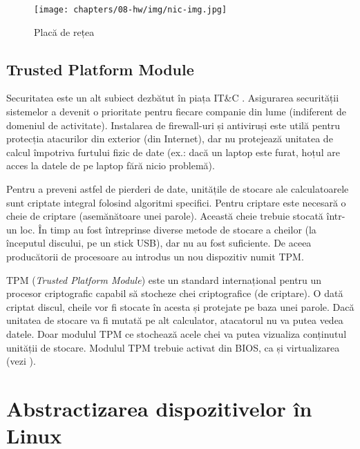 \begin{figure}[!htbp]
	\centering
	\texttt{[image: chapters/08-hw/img/nic-img.jpg]}
	\caption{Placă de rețea\protect\footnotemark}
	\label{fig:hw:nic}
\end{figure}


\subsection{Trusted Platform Module}
\label{sec:hw:features:tpm}

Securitatea este un alt subiect dezbătut în piața IT\&C
. Asigurarea
securității sistemelor a devenit o prioritate pentru fiecare companie din lume
(indiferent de domeniul de activitate). Instalarea de firewall-uri și antiviruși
este utilă pentru protecția atacurilor din exterior (din Internet), dar nu
protejează unitatea de calcul împotriva furtului fizic de date (ex.: dacă un
laptop este furat, hoțul are acces la datele de pe laptop fără nicio problemă).

Pentru a preveni astfel de pierderi de date, unitățile de stocare ale
calculatoarele sunt criptate integral folosind algoritmi specifici. Pentru
criptare este necesară o cheie de criptare (asemănătoare unei parole). Această
cheie trebuie stocată într-un loc. În timp au fost întreprinse diverse metode de
stocare a cheilor (la începutul discului, pe un stick USB), dar nu au fost
suficiente. De aceea producătorii de procesoare au introdus un nou dispozitiv
numit TPM.

TPM (\textit{Trusted Platform Module}) este un standard internațional
pentru un procesor criptografic capabil să stocheze chei criptografice (de
criptare). O dată criptat discul, cheile vor fi stocate în acesta și protejate
pe baza unei parole. Dacă unitatea de stocare va fi mutată pe alt calculator,
atacatorul nu va putea vedea datele. Doar modulul TPM ce stochează acele chei va
putea vizualiza conținutul unității de stocare. Modulul TPM trebuie activat din
BIOS, ca și virtualizarea (vezi ).

\section{Abstractizarea dispozitivelor în Linux}
\label{sec:hw:abstraction}


